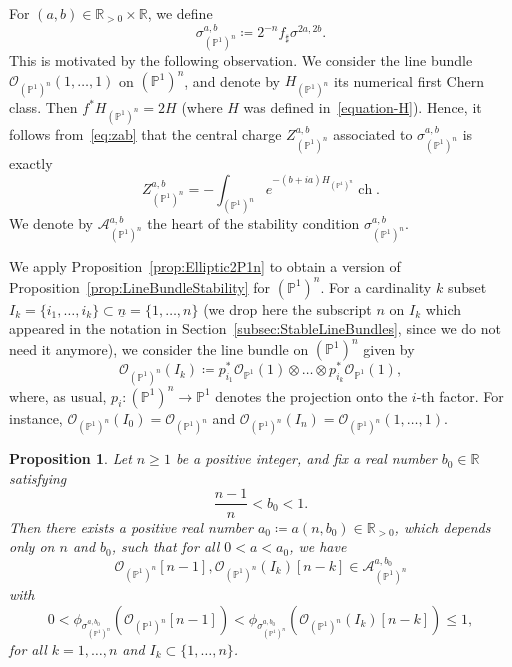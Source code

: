 \documentclass[11pt, reqno]{amsart}
\numberwithin{equation}{section}
\theoremstyle{plain}
\newtheorem{proposition}[theorem]{Proposition}
\theoremstyle{remark}
\theoremstyle{definition}
\theoremstyle{italicsname}
\DeclareMathOperator{\ch}{{ch}}
\newcommand{\cO}{\mathcal{O}}
\newcommand{\cA}{\mathscr{A}}
\def\RR{\ensuremath{\mathbb{R}}}
\def\PP{\ensuremath{\mathbb{P}}}
\begin{document}
For $(a,b)\in\RR_{>0}\times\RR$, we define
\begin{equation}\label{eq:StabonP1n}
\sigma^{a,b}_{(\PP^1)^n}\coloneqq 2^{-n} f_\sharp\sigma^{2a,2b}.    
\end{equation}
This is motivated by the following observation.
We consider the line bundle $\cO_{(\PP^1)^n}(1,\dots,1)$ on $(\PP^1)^n$, and denote by $H_{(\PP^1)^n}$ its numerical first Chern class.
Then $f^*H_{(\PP^1)^n}=2H$ (where $H$ was defined in~\eqref{equation-H}).
Hence, it follows from~\eqref{eq:zab} that the central charge $Z^{a,b}_{(\PP^1)^n}$ associated to $\sigma^{a,b}_{(\PP^1)^n}$ is exactly
\begin{equation*}\label{eq:DefOfSigmaabP1n}
Z^{a,b}_{(\PP^1)^n}=-\int_{(\PP^1)^n} e^{-(b+ia)H_{(\PP^1)^n}}\ch.    
\end{equation*}
We denote by $\cA^{a,b}_{(\PP^1)^n}$ the heart of the stability condition $\sigma^{a,b}_{(\PP^1)^n}$. 

We apply Proposition~\ref{prop:Elliptic2P1n} to obtain a version of Proposition~\ref{prop:LineBundleStability} for $(\PP^1)^n$.
For a cardinality $k$ subset $I_{k}=\{i_1,\dots,i_k\}\subset \underline{n} = \{1,\dots,n\}$ (we drop here the subscript $n$ on $I_{k}$ which appeared in the notation in Section~\ref{subsec:StableLineBundles}, since we do not need it anymore), we consider the line bundle on $(\PP^1)^n$ given by
\[
\cO_{(\PP^1)^n}(I_{k})\coloneqq p_{i_1}^*\cO_{\PP^1}(1)\otimes\dots\otimes p_{i_k}^*\cO_{\PP^1}(1),
\]
where, as usual, $p_i\colon(\PP^1)^n\to\PP^1$ denotes the projection onto the $i$-th factor.
For instance, $\cO_{(\PP^1)^n}(I_{0})=\cO_{(\PP^1)^n}$ and $\cO_{(\PP^1)^n}(I_{n})=\cO_{(\PP^1)^n}(1,\dots,1)$.

\begin{proposition}\label{prop:LineBundleStabilityP1n}
Let $n\geq1$ be a positive integer, and fix a real number $b_0 \in \RR$ satisfying 
\begin{equation*}
    \frac{n-1}{n}<b_0<1. 
\end{equation*}
Then there exists a positive real number $a_0\coloneqq a(n,b_0)\in\RR_{>0}$, which depends only on $n$ and $b_0$, such that for all $0<a<a_0$, we have
\[
\cO_{(\PP^1)^n}[n-1],\cO_{(\PP^1)^n}(I_{k})[n-k]\in\cA_{(\PP^1)^n}^{a,b_0} 
\]
with
\[
0<\phi_{\sigma_{(\PP^1)^n}^{a,b_0}}(\cO_{(\PP^1)^n}[n-1])<\phi_{\sigma_{(\PP^1)^n}^{a,b_0}}(\cO_{(\PP^1)^n}(I_{k})[n-k])\leq 1,
\]
for all $k=1,\dots,n$ and $I_{k}\subset\{1,\dots,n\}$.
\end{proposition}
\end{document}
